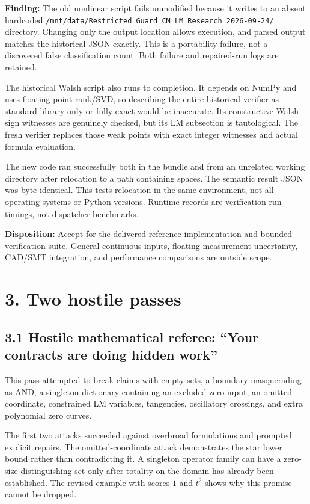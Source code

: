 \documentclass[
  11pt,
]{article}
\begin{document}
\textbf{Finding:} The old nonlinear script fails unmodified because it
writes to an absent hardcoded
\texttt{/mnt/data/Restricted\_Guard\_CM\_LM\_Research\_2026-09-24/}
directory. Changing only the output location allows execution, and
parsed output matches the historical JSON exactly. This is a portability
failure, not a discovered false classification count. Both failure and
repaired-run logs are retained.

The historical Walsh script also runs to completion. It depends on NumPy
and uses floating-point rank/SVD, so describing the entire historical
verifier as standard-library-only or fully exact would be inaccurate.
Its constructive Walsh sign witnesses are genuinely checked, but its LM
subsection is tautological. The fresh verifier replaces those weak
points with exact integer witnesses and actual formula evaluation.

The new code ran successfully both in the bundle and from an unrelated
working directory after relocation to a path containing spaces. The
semantic result JSON was byte-identical. This tests relocation in the
same environment, not all operating systems or Python versions. Runtime
records are verification-run timings, not dispatcher benchmarks.

\textbf{Disposition:} Accept for the delivered reference implementation
and bounded verification suite. General continuous inputs, floating
measurement uncertainty, CAD/SMT integration, and performance
comparisons are outside scope.

\section{3. Two hostile passes}\label{two-hostile-passes}

\subsection{3.1 Hostile mathematical referee: ``Your contracts are doing
hidden
work''}\label{hostile-mathematical-referee-your-contracts-are-doing-hidden-work}

This pass attempted to break claims with empty sets, a boundary
masquerading as AND, a singleton dictionary containing an excluded zero
input, an omitted coordinate, constrained LM variables, tangencies,
oscillatory crossings, and extra polynomial zero curves.

The first two attacks succeeded against overbroad formulations and
prompted explicit repairs. The omitted-coordinate attack demonstrates
the star lower bound rather than contradicting it. A singleton operator
family can have a zero-size distinguishing set only after totality on
the domain has already been established. The revised example with scores
\(1\) and \(t^2\) shows why this promise cannot be dropped.
\end{document}
